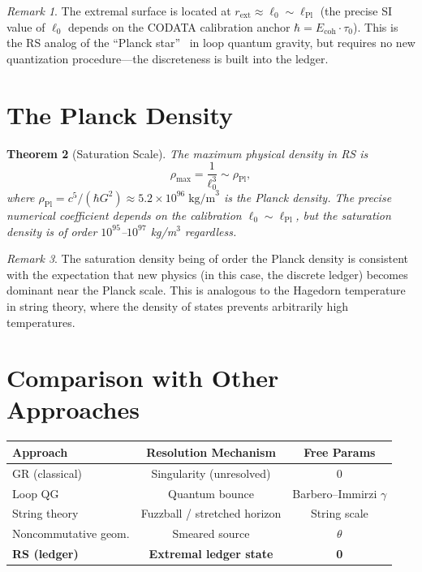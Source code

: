 \documentclass[12pt,a4paper]{article}
\newtheorem{theorem}{Theorem}[section]
\theoremstyle{definition}
\theoremstyle{remark}
\newtheorem{remark}[theorem]{Remark}
\begin{document}
\begin{remark}
The extremal surface is located at
$r_{\mathrm{ext}} \approx \ell_0 \sim \ell_{\mathrm{Pl}}$
(the precise SI value of $\ell_0$ depends on the CODATA
calibration anchor $\hbar = E_{\mathrm{coh}} \cdot \tau_0$).
This is the RS analog of the ``Planck
star''~\cite{Rovelli2014} in loop quantum gravity, but
requires no new quantization procedure---the discreteness
is built into the ledger.
\end{remark}

\section{The Planck Density}
\label{sec:planck-density}

\begin{theorem}[Saturation Scale]
The maximum physical density in RS is
\begin{equation}
  \rho_{\max} = \frac{1}{\ell_0^3}
  \sim \rho_{\mathrm{Pl}},
\end{equation}
where $\rho_{\mathrm{Pl}} = c^5/(\hbar G^2) \approx
5.2 \times 10^{96}\;\mathrm{kg/m}^3$ is the Planck
density.  The precise numerical coefficient depends on
the calibration $\ell_0 \sim \ell_{\mathrm{Pl}}$, but
the saturation density is of order $10^{95}$--$10^{97}$
kg/m$^3$ regardless.
\end{theorem}

\begin{remark}
The saturation density being of order the Planck density
is consistent with the expectation that new physics (in
this case, the discrete ledger) becomes dominant near the
Planck scale.  This is analogous to the Hagedorn temperature
in string theory, where the density of states prevents
arbitrarily high temperatures.
\end{remark}

\section{Comparison with Other Approaches}
\label{sec:comparison}

\begin{center}
\renewcommand{\arraystretch}{1.3}
\begin{tabular}{@{}lcc@{}}
\toprule
\textbf{Approach} & \textbf{Resolution Mechanism} &
\textbf{Free Params} \\
\midrule
GR (classical) & Singularity (unresolved) & 0 \\
Loop QG & Quantum bounce & Barbero--Immirzi $\gamma$ \\
String theory & Fuzzball / stretched horizon & String scale \\
Noncommutative geom. & Smeared source & $\theta$ \\
\textbf{RS (ledger)} & \textbf{Extremal ledger state} &
\textbf{0} \\
\bottomrule
\end{tabular}
\end{center}
\end{document}
